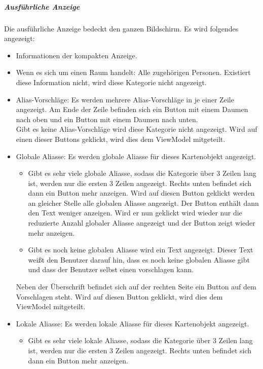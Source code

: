 \subparagraph*{Ausführliche Anzeige}
Die ausführliche Anzeige bedeckt den ganzen Bildschirm.
Es wird folgendes angezeigt:
\begin{itemize}
    \item Informationen der kompakten Anzeige.
    \item Wenn es sich um einen Raum handelt: Alle zugehörigen Personen. 
    Existiert diese Information nicht, wird diese Kategorie nicht angezeigt.
    \item Alias-Vorschläge: Es werden mehrere Alias-Vorschläge in je einer Zeile angezeigt. 
    Am Ende der Zeile befinden sich ein Button mit einem Daumen nach oben und ein Button mit einem Daumen nach unten.\\
    Gibt es keine Alias-Vorschläge wird diese Kategorie nicht angezeigt. 
    Wird auf einen dieser Buttons geklickt, wird dies dem ViewModel mitgeteilt.
    \item Globale Aliasse: Es werden globale Aliasse für dieses Kartenobjekt angezeigt.
    \begin{itemize}
        \item Gibt es sehr viele globale Aliasse, sodass die Kategorie über 3 Zeilen lang ist, werden nur 
        die ersten 3 Zeilen angezeigt. Rechts unten befindet sich dann ein Button \dq{}mehr anzeigen\dq{}. 
        Wird auf diesen Button geklickt werden an gleicher Stelle  alle globalen Aliasse angezeigt. 
        Der Button enthält dann den Text \dq{}weniger anzeigen\dq{}. Wird er nun geklickt wird wieder nur die 
        reduzierte Anzahl globaler Aliasse angezeigt und der Button zeigt wieder \dq{}mehr anzeigen\dq{}.
        \item Gibt es noch keine globalen Aliasse wird ein Text angezeigt. Dieser Text weißt den Benutzer 
        darauf hin, dass es noch keine globalen Aliasse gibt und dass der Benutzer selbst einen vorschlagen kann.
    \end{itemize}
    Neben der Überschrift befindet sich auf der rechten Seite ein Button auf dem \dq{}Vorschlagen\dq{} steht.
    Wird auf diesen Button geklickt, wird dies dem ViewModel mitgeteilt.
    \item Lokale Aliasse: Es werden lokale Aliasse für dieses Kartenobjekt angezeigt. 
    \begin{itemize}
        \item Gibt es sehr viele lokale Aliasse, sodass die Kategorie über 3 Zeilen lang ist, werden nur 
        die ersten 3 Zeilen angezeigt. Rechts unten befindet sich dann ein Button \dq{}mehr anzeigen\dq{}. 

\end{itemize}
\end{itemize}
